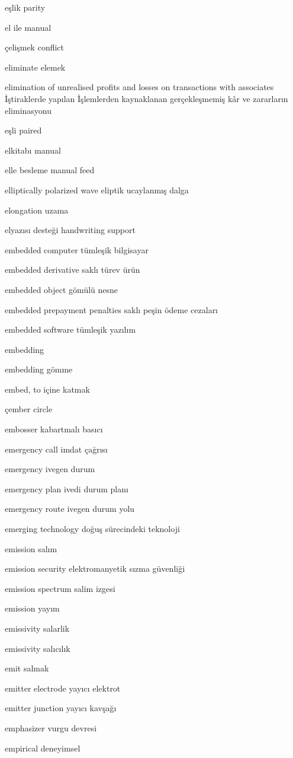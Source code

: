 \documentclass[12pt,fleqn]{article}\usepackage{../../common}
\begin{document}
eşlik parity

el ile manual

çelişmek conflict

eliminate elemek

elimination of unrealised profits and losses on transactions with associates İştiraklerde yapılan İşlemlerden kaynaklanan gerçekleşmemiş kâr ve zararların eliminasyonu

eşli paired

elkitabı manual

elle besleme manual feed

elliptically polarized wave eliptik ucaylanmış dalga

elongation uzama

elyazısı desteği handwriting support

embedded computer tümleşik bilgisayar

embedded derivative saklı türev ürün

embedded object gömülü nesne

embedded prepayment penalties saklı peşin ödeme cezaları

embedded software tümleşik yazılım

embedding

embedding gömme

embed, to içine katmak

çember circle

embosser kabartmalı basıcı

emergency call imdat çağrısı

emergency ivegen durum

emergency plan ivedi durum planı

emergency route ivegen durum yolu

emerging technology doğuş sürecindeki teknoloji

emission salım

emission security elektromanyetik sızma güvenliği

emission spectrum salim izgesi

emission yayım

emissivity salarlik

emissivity salıcılık

emit salmak

emitter electrode yayıcı elektrot

emitter junction yayıcı kavşağı

emphasizer vurgu devresi

empirical deneyimsel
\end{document}
